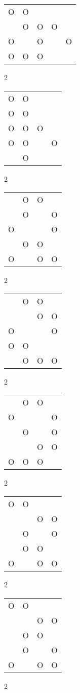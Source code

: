 \begin{tabular}{|m{0.2cm}m{0.2cm}m{0.2cm}m{0.2cm}m{0.2cm}|}\hline
O&O& & & \\
 &O&O&O& \\
O& &O& &O\\
O&O&O& & \\
\hline\end{tabular}2
\begin{tabular}{|m{0.2cm}m{0.2cm}m{0.2cm}m{0.2cm}|}\hline
O&O& & \\
O&O& & \\
O&O&O& \\
O&O& &O\\
 &O& & \\
\hline\end{tabular}2
\begin{tabular}{|m{0.2cm}m{0.2cm}m{0.2cm}m{0.2cm}|}\hline
 &O&O& \\
 &O& &O\\
O& & &O\\
 &O&O& \\
O& &O&O\\
\hline\end{tabular}2
\begin{tabular}{|m{0.2cm}m{0.2cm}m{0.2cm}m{0.2cm}|}\hline
 &O&O& \\
 & &O&O\\
O& & &O\\
O&O& & \\
 &O&O&O\\
\hline\end{tabular}2
\begin{tabular}{|m{0.2cm}m{0.2cm}m{0.2cm}m{0.2cm}|}\hline
 &O&O& \\
O& & &O\\
 &O& &O\\
 & &O&O\\
O&O&O& \\
\hline\end{tabular}2
\begin{tabular}{|m{0.2cm}m{0.2cm}m{0.2cm}m{0.2cm}|}\hline
O&O& & \\
 & &O&O\\
 &O& &O\\
 &O&O& \\
O& &O&O\\
\hline\end{tabular}2
\begin{tabular}{|m{0.2cm}m{0.2cm}m{0.2cm}m{0.2cm}|}\hline
O&O& & \\
 & &O&O\\
 &O&O& \\
 &O& &O\\
O& &O&O\\
\hline\end{tabular}2
